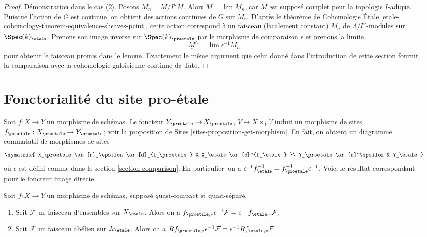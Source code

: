 \begin{proof}
Démonstration dans le cas (2). Posons $M_n = M/I^nM$. Alors $M = \lim M_n$, car $M$ est
supposé complet pour la topologie $I$-adique. Puisque l'action de $G$ est continue,
on obtient des actions continues de $G$ sur $M_n$. D'après le théorème de Cohomologie \'Etale
\ref{etale-cohomology-theorem-equivalence-sheaves-point},
cette action correspond à un faisceau (localement constant)
$\underline{M_n}$ de $\Lambda/I^n$-modules sur $\Spec(k)_\etale$.
Prenons son image inverse sur $\Spec(k)_\proetale$ par le morphisme de comparaison
$\epsilon$ et prenons la limite
$$
\underline{M}^\wedge = \lim \epsilon^{-1}\underline{M_n}
$$
pour obtenir le faisceau promis dans le lemme. Exactement le même argument que
celui donné dans l'introduction de cette section fournit la comparaison
avec la cohomologie galoisienne continue de Tate.
\end{proof}






\section{Fonctorialité du site pro-\'etale}
\label{section-morphism}

\noindent
Soit $f : X \to Y$ un morphisme de schémas. Le foncteur
$Y_\proetale \to X_\proetale$, $V \mapsto X \times_Y V$
induit un morphisme de sites $f_\proetale : X_\proetale \to Y_\proetale$; voir la
proposition de Sites \ref{sites-proposition-get-morphism}.
En fait, on obtient un diagramme commutatif de morphismes de sites
$$
\xymatrix{
X_\proetale \ar[r]_\epsilon \ar[d]_{f_\proetale} &
X_\etale \ar[d]^{f_\etale} \\
Y_\proetale \ar[r]^\epsilon & Y_\etale
}
$$
où $\epsilon$ est défini comme dans la section \ref{section-comparison}.
En particulier, on a
$\epsilon^{-1} f_\etale^{-1} = f_\proetale^{-1} \epsilon^{-1}$.
Voici le résultat correspondant pour le foncteur image directe.

\begin{lemma}
\label{lemma-morphism-comparison}
Soit $f : X \to Y$ un morphisme de schémas, supposé quasi-compact et
quasi-séparé.
\begin{enumerate}
\item Soit $\mathcal{F}$ un faisceau d'ensembles sur $X_\etale$. Alors on a
$f_{\proetale, *}\epsilon^{-1}\mathcal{F} =
\epsilon^{-1}f_{\etale, *}\mathcal{F}$.
\item Soit $\mathcal{F}$ un faisceau abélien sur $X_\etale$. Alors on a
$Rf_{\proetale, *}\epsilon^{-1}\mathcal{F} =
\epsilon^{-1}Rf_{\etale, *}\mathcal{F}$.
\end{enumerate}
\end{lemma}

